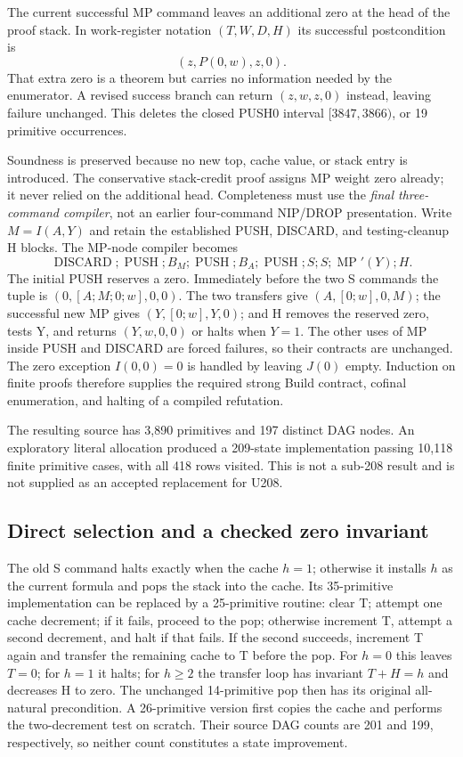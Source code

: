 \documentclass[11pt,a4paper]{article}
\begin{document}
The current successful MP command leaves an additional zero at the head of
the proof stack. In work-register notation $(T,W,D,H)$ its successful
postcondition is
\[
(z,P(0,w),z,0).
\]
That extra zero is a theorem but carries no information needed by the
enumerator. A revised success branch can return $(z,w,z,0)$ instead, leaving
failure unchanged. This deletes the closed PUSH0 interval
$[3847,3866)$, or 19 primitive occurrences.

Soundness is preserved because no new top, cache value, or stack entry is
introduced. The conservative stack-credit proof assigns MP weight zero
already; it never relied on the additional head. Completeness must use the
\emph{final three-command compiler}, not an earlier four-command
NIP/DROP presentation. Write $M=I(A,Y)$ and retain the established PUSH,
DISCARD, and testing-cleanup H blocks. The MP-node compiler becomes
\[
\operatorname{DISCARD};\operatorname{PUSH};B_M;\operatorname{PUSH};
B_A;\operatorname{PUSH};S;S;\operatorname{MP}'(Y);H.
\]
The initial PUSH reserves a zero. Immediately before the two S commands the
tuple is $(0,[A;M;0;w],0,0)$. The two transfers give $(A,[0;w],0,M)$;
the successful new MP gives $(Y,[0;w],Y,0)$; and H removes the reserved zero,
tests Y, and returns $(Y,w,0,0)$ or halts when $Y=1$. The other uses of MP
inside PUSH and DISCARD are forced failures, so their contracts are
unchanged. The zero exception $I(0,0)=0$ is handled by leaving $J(0)$ empty.
Induction on finite proofs therefore supplies the required strong Build
contract, cofinal enumeration, and halting of a compiled refutation.

The resulting source has 3,890 primitives and 197 distinct DAG nodes. An
exploratory literal allocation produced a 209-state implementation passing
10,118 finite primitive cases, with all 418 rows visited. This is not a
sub-208 result and is not supplied as an accepted replacement for U208.

\subsection{Direct selection and a checked zero invariant}

The old S command halts exactly when the cache $h=1$; otherwise it installs
$h$ as the current formula and pops the stack into the cache. Its 35-primitive
implementation can be replaced by a 25-primitive routine: clear T; attempt
one cache decrement; if it fails, proceed to the pop; otherwise increment T,
attempt a second decrement, and halt if that fails. If the second succeeds,
increment T again and transfer the remaining cache to T before the pop.
For $h=0$ this leaves $T=0$; for $h=1$ it halts; for $h\geq2$ the transfer
loop has invariant $T+H=h$ and decreases H to zero. The unchanged 14-primitive
pop then has its original all-natural precondition. A 26-primitive version
first copies the cache and performs the two-decrement test on scratch.
Their source DAG counts are 201 and 199, respectively, so neither count
constitutes a state improvement.
\end{document}

